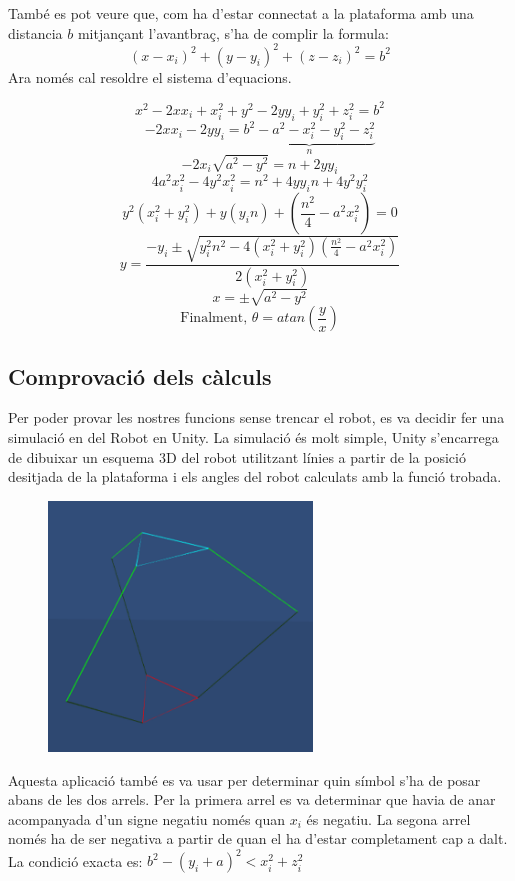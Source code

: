 També es pot veure que, com ha d'estar connectat a la plataforma amb una distancia $b$ mitjançant l'avantbraç, s'ha de complir la formula: \[(x-x_i)^2+(y-y_i)^2+(z-z_i)^2=b^2\]
Ara només cal resoldre el sistema d'equacions.

\[x^2 - 2xx_i + x_i^2 + y^2 - 2yy_i + y_i^2 + z_i^2 = b^2\]
\[-2xx_i - 2yy_i = \underbrace{b^2 - a^2 - x_i^2 - y_i^2 - z_i^2}_{n}\]
\[-2x_i\sqrt{a^2-y^2}=n+2yy_i\]
\[4a^2x_i^2-4y^2x_i^2=n^2+4yy_in+4y^2y_i^2\]
\[y^2(x_i^2+y_i^2)+y(y_in)+(\frac{n^2}{4}-a^2x_i^2)=0\]
\[y=\frac{-y_i\pm\sqrt{y_i^2n^2-4(x_i^2+y_i^2)(\frac{n^2}{4}-a^2x_i^2)}}{2(x_i^2+y_i^2)}\]
\[x=\pm\sqrt{a^2-y^2}\]
\[\textrm{Finalment, }\theta=atan(\frac{y}{x})\]

\subsection{Comprovació dels càlculs}

Per poder provar les nostres funcions sense trencar el robot, es va decidir fer una simulació en del Robot en Unity. La simulació és molt simple, Unity s'encarrega de dibuixar un esquema 3D del robot utilitzant línies a partir de la posició desitjada de la plataforma i els angles del robot calculats amb la funció trobada.

\begin{figure}[h!]
\centering
\includegraphics[width=7cm]{./images/simulacioRobot}
\end{figure}

Aquesta aplicació també es va usar per determinar quin símbol s'ha de posar abans de les dos arrels. Per la primera arrel es va determinar que havia de anar acompanyada d'un signe negatiu només quan \(x_i\) és negatiu. La segona arrel només ha de ser negativa a partir de quan el ha d'estar completament cap a dalt. La condició exacta es: \(b^2-(y_i+a)^2<x_i^2+z_i^2\) 

